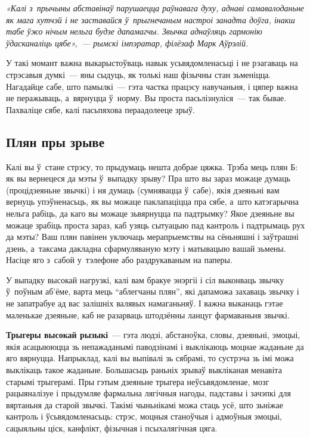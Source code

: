 \emph{«Калі з~прычыны абставінаў парушаецца раўнавага духу, аднаві самавалоданьне як мага хутчэй і не заставайся ў~прыгнечаным настроі занадта доўга, інакш табе ўжо нічым нельга будзе дапамагчы. Звычка аднаўляць гармонію ўдасканаліць цябе»,~--- рымскі імпэратар, філёзаф Марк Аўрэлій.}

У такі момант важна выкарыстоўваць навык усьвядомленасьці і не рэагаваць на стрэсавыя думкі~--- яны сыдуць, як толькі наш фізычны стан зьменіцца. Нагадайце сабе, што памылкі~--- гэта частка працэсу навучаньня, і цяпер важна не перажываць, а~вярнуцца ў~норму. Вы проста пасьлізнуліся~--- так бывае. Пахваліце сябе, калі пасьпяхова пераадолееце зрыў.

\subsection*{Плян пры зрыве}

Калі вы ў~стане стрэсу, то прыдумаць нешта добрае цяжка. Трэба мець плян Б: як вы вернецеся да мэты ў~выпадку зрыву? Пра што вы зараз можаце думаць (процідзеяньне звычкі) і ня думаць (сумнявацца ў~сабе), якія дзеяньні вам вернуць упэўненасьць, як вы можаце паклапаціцца пра сябе, а~што катэгарычна нельга рабіць, да каго вы можаце зьвярнуцца па падтрымку? Якое дзеяньне вы можаце зрабіць проста зараз, каб узяць сытуацыю пад кантроль і падтрымаць рух да мэты? Ваш плян павінен уключаць мерапрыемствы на сёньняшні і заўтрашні дзень, а~таксама дакладна сфармуляваную мэту і матывацыю вашай зьмены. Насіце яго з~сабой у~тэлефоне або раздрукаваным на паперы.

У выпадку высокай нагрузкі, калі вам бракуе энэргіі і сіл выконваць звычку ў~поўным аб'ёме, варта мець ``аблегчаны плян'', які дапаможа захаваць звычку і не запатрабуе ад вас залішніх валявых намаганьняў. І важна выканаць гэтае маленькае дзеяньне, каб не разарваць штодзённы ланцуг фармаваньня звычкі.

\textbf{Трыгеры высокай рызыкі}~--- гэта людзі, абстаноўка, словы, дзеяньні, эмоцыі, якія асацыююцца зь непажаданымі паводзінамі і выклікаюць моцнае жаданьне да яго вярнуцца. Напрыклад, калі вы выпівалі зь сябрамі, то сустрэча зь імі можа выклікаць такое жаданьне. Большасьць раньніх зрываў выкліканая менавіта старымі трыгерамі. Пры гэтым дзеяньне трыгера неўсьвядомленае, мозг рацыяналізуе і прыдумляе фармальна лягічныя нагоды, падставы і зачэпкі для вяртаньня да старой звычкі. Такімі чыньнікамі можа стаць усё, што зьніжае кантроль і ўсьвядомленасьць: стрэс, моцныя станоўчыя і адмоўныя эмоцыі, сацыяльны ціск, канфлікт, фізычная і псыхалягічная цяга.

